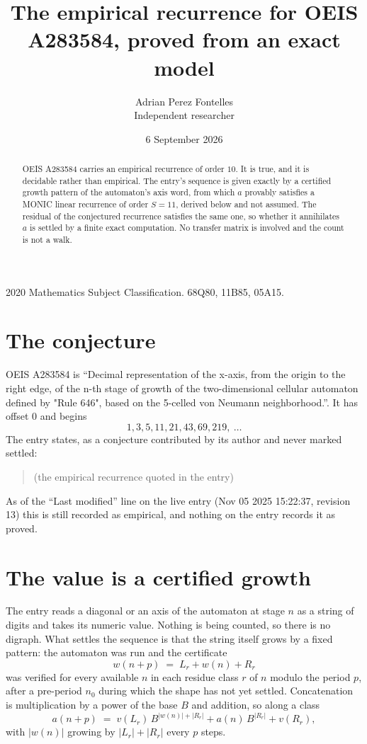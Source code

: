 \documentclass[11pt,a4paper]{article}
\title{The empirical recurrence for OEIS A283584, proved from an exact model}
\author{Adrian Perez Fontelles\\ \small Independent researcher}
\date{6 September 2026}
\theoremstyle{plain}
\theoremstyle{definition}
\begin{document}
\maketitle

\begin{abstract}
OEIS A283584 carries an empirical recurrence of order $10$. It is true, and it is
decidable rather than empirical. The entry's sequence is given exactly by a certified growth pattern of the automaton's axis word, from
which $a$ provably satisfies a MONIC linear recurrence of order $S=11$, derived below and not
assumed. The residual of the conjectured recurrence satisfies the same one, so whether it
annihilates $a$ is settled by a finite exact computation. No transfer matrix is involved and
the count is not a walk.
\end{abstract}

\noindent\small 2020 Mathematics Subject Classification. 68Q80, 11B85, 05A15.\normalsize

\section{The conjecture}

OEIS A283584 is ``Decimal representation of the x-axis, from the origin to the right edge, of the n-th stage of growth of the two-dimensional cellular automaton defined by "Rule 646", based on the 5-celled von Neumann neighborhood.''. It has offset $0$ and begins
\[
1, 3, 5, 11, 21, 43, 69, 219,\ \dots
\]
The entry states, as a conjecture contributed by its author and never marked settled:
\begin{quote}
(the empirical recurrence quoted in the entry)
\end{quote}
As of the ``Last modified'' line on the live entry (Nov 05 2025 15:22:37, revision 13)
this is still recorded as empirical, and nothing on the entry records it as proved.

\section{The value is a certified growth}

The entry reads a diagonal or an axis of the automaton at stage $n$ as a string of digits and takes its
numeric value. Nothing is being counted, so there is no digraph. What settles the sequence is
that the string itself grows by a fixed pattern: the automaton was run and the certificate
\[
w(n+p)\;=\;L_r + w(n) + R_r
\]
was verified for every available $n$ in each residue class $r$ of $n$ modulo the period $p$,
after a pre-period $n_0$ during which the shape has not yet settled. Concatenation is
multiplication by a power of the base $B$ and addition, so along a class
\[
a(n+p)\;=\;v(L_r)\,B^{|w(n)|+|R_r|} + a(n)\,B^{|R_r|} + v(R_r),
\]
with $|w(n)|$ growing by $|L_r|+|R_r|$ every $p$ steps.
\end{document}
